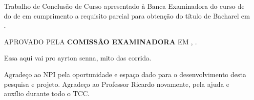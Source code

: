 \documentclass[12pt,openright,oneside,a4paper,english,french,spanish,brazil]{unifil}
\begin{document}
\begin{folhadeaprovacao}
	\begin{center}
		\ABNTEXchapterfont\textbf{\MakeTextUppercase{\imprimirautor}}
		\vspace*{2cm}
		\begin{center}
			\ABNTEXchapterfont\large\textbf{\MakeTextUppercase{\imprimirtitulo}}
		\end{center}
		\vspace*{2cm}
		Trabalho de Conclusão de Curso apresentado à Banca Examinadora do curso de \imprimirpreambulo do \imprimirinstituicao de \imprimirlocal em cumprimento a requisito parcial para obtenção do título de Bacharel em \imprimirpreambulo.
		\par
		\vspace*{.5in}
		\hspace{.6\textwidth}
		\begin{minipage}{.6\textwidth}
			\begin{center}
\MakeTextUppercase{Aprovado pela \textbf{COMISSÃO EXAMINADORA} em \imprimirlocal, \imprimirdata.}
			\end{center}
		\end{minipage}
			\vspace*{\fill}
	\end{center}
\end{folhadeaprovacao}


\begin{epigrafe}
\vspace*{\fill}
\begin{flushright}
Essa aqui vai pro ayrton senna, mito das corrida.
\end{flushright}
\end{epigrafe} %


\begin{agradecimentos}

Agradeço ao NPI pela oportunidade e espaço dado para o desenvolvimento desta pesquisa e projeto.
Agradeço ao Professor Ricardo novamente, pela ajuda e auxílio durante todo o TCC.
\end{agradecimentos}

\end{document}

